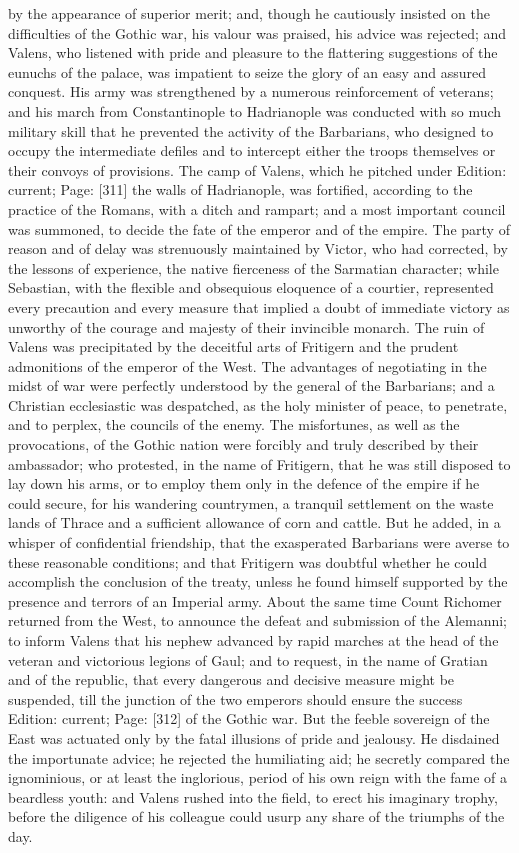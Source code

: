 by the appearance of superior merit; and, though he cautiously insisted on the difficulties of the Gothic war, his valour was praised, his advice was rejected; and Valens, who listened with pride and pleasure to the flattering suggestions of the eunuchs of the palace, was impatient to seize the glory of an easy and assured conquest. His army was strengthened by a numerous reinforcement of veterans; and his march from Constantinople to Hadrianople was conducted with so much military skill that he prevented the activity of the Barbarians, who designed to occupy the intermediate defiles and to intercept either the troops themselves or their convoys of provisions. The camp of Valens, which he pitched under Edition: current; Page: [311] the walls of Hadrianople, was fortified, according to the practice of the Romans, with a ditch and rampart; and a most important council was summoned, to decide the fate of the emperor and of the empire. The party of reason and of delay was strenuously maintained by Victor, who had corrected, by the lessons of experience, the native fierceness of the Sarmatian character; while Sebastian, with the flexible and obsequious eloquence of a courtier, represented every precaution and every measure that implied a doubt of immediate victory as unworthy of the courage and majesty of their invincible monarch. The ruin of Valens was precipitated by the deceitful arts of Fritigern and the prudent admonitions of the emperor of the West. The advantages of negotiating in the midst of war were perfectly understood by the general of the Barbarians; and a Christian ecclesiastic was despatched, as the holy minister of peace, to penetrate, and to perplex, the councils of the enemy. The misfortunes, as well as the provocations, of the Gothic nation were forcibly and truly described by their ambassador; who protested, in the name of Fritigern, that he was still disposed to lay down his arms, or to employ them only in the defence of the empire if he could secure, for his wandering countrymen, a tranquil settlement on the waste lands of Thrace and a sufficient allowance of corn and cattle. But he added, in a whisper of confidential friendship, that the exasperated Barbarians were averse to these reasonable conditions; and that Fritigern was doubtful whether he could accomplish the conclusion of the treaty, unless he found himself supported by the presence and terrors of an Imperial army. About the same time Count Richomer returned from the West, to announce the defeat and submission of the Alemanni; to inform Valens that his nephew advanced by rapid marches at the head of the veteran and victorious legions of Gaul; and to request, in the name of Gratian and of the republic, that every dangerous and decisive measure might be suspended, till the junction of the two emperors should ensure the success Edition: current; Page: [312] of the Gothic war. But the feeble sovereign of the East was actuated only by the fatal illusions of pride and jealousy. He disdained the importunate advice; he rejected the humiliating aid; he secretly compared the ignominious, or at least the inglorious, period of his own reign with the fame of a beardless youth: and Valens rushed into the field, to erect his imaginary trophy, before the diligence of his colleague could usurp any share of the triumphs of the day.

